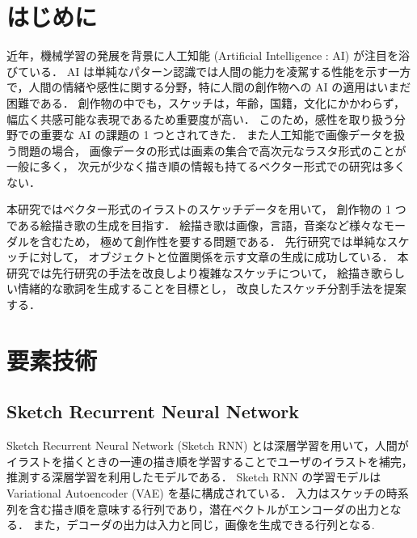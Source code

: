 \documentclass[twocolumn]{jarticle}     %
\begin{document}


\section{はじめに}




  近年，機械学習の発展を背景に人工知能 (Artificial Intelligence : AI) が注目を浴びている．
  AI は単純なパターン認識では人間の能力を凌駕する性能を示す一方で，人間の情緒や感性に関する分野，特に人間の創作物への AI の適用はいまだ困難である．
  創作物の中でも，スケッチは，年齢，国籍，文化にかかわらず，幅広く共感可能な表現であるため重要度が高い．
  このため，感性を取り扱う分野での重要な AI の課題の 1 つとされてきた．
  また人工知能で画像データを扱う問題の場合，
  画像データの形式は画素の集合で高次元なラスタ形式のことが一般に多く，
  次元が少なく描き順の情報も持てるベクター形式での研究は多くない．

  本研究ではベクター形式のイラストのスケッチデータを用いて，
  創作物の 1 つである絵描き歌の生成を目指す．
  絵描き歌は画像，言語，音楽など様々なモーダルを含むため，
  極めて創作性を要する問題である．
  先行研究では単純なスケッチに対して，
  オブジェクトと位置関係を示す文章の生成に成功している．
  本研究では先行研究の手法を改良しより複雑なスケッチについて，
  絵描き歌らしい情緒的な歌詞を生成することを目標とし，
  改良したスケッチ分割手法を提案する．


\section{要素技術}

  \subsection{Sketch Recurrent Neural Network}	\label{tau}
    Sketch Recurrent Neural Network (Sketch RNN) \cite{sketchrnn} とは深層学習を用いて，人間がイラストを描くときの一連の描き順を学習することでユーザのイラストを補完，推測する深層学習を利用したモデルである．
    Sketch RNN の学習モデルは Variational Autoencoder (VAE) を基に構成されている．
    入力はスケッチの時系列を含む描き順を意味する行列であり，潜在ベクトルがエンコーダの出力となる．
    また，デコーダの出力は入力と同じ，画像を生成できる行列となる.
\end{document}
